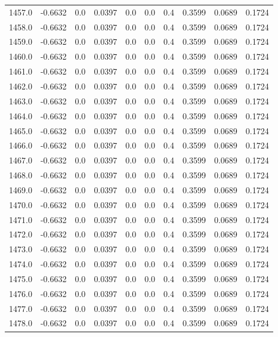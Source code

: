 \begin{longtable}{lrrrrrrrrr}
1457.0 & -0.6632 & 0.0 & 0.0397 & 0.0 & 0.0 & 0.4 & 0.3599 & 0.0689 & 0.1724 \\
1458.0 & -0.6632 & 0.0 & 0.0397 & 0.0 & 0.0 & 0.4 & 0.3599 & 0.0689 & 0.1724 \\
1459.0 & -0.6632 & 0.0 & 0.0397 & 0.0 & 0.0 & 0.4 & 0.3599 & 0.0689 & 0.1724 \\
1460.0 & -0.6632 & 0.0 & 0.0397 & 0.0 & 0.0 & 0.4 & 0.3599 & 0.0689 & 0.1724 \\
1461.0 & -0.6632 & 0.0 & 0.0397 & 0.0 & 0.0 & 0.4 & 0.3599 & 0.0689 & 0.1724 \\
1462.0 & -0.6632 & 0.0 & 0.0397 & 0.0 & 0.0 & 0.4 & 0.3599 & 0.0689 & 0.1724 \\
1463.0 & -0.6632 & 0.0 & 0.0397 & 0.0 & 0.0 & 0.4 & 0.3599 & 0.0689 & 0.1724 \\
1464.0 & -0.6632 & 0.0 & 0.0397 & 0.0 & 0.0 & 0.4 & 0.3599 & 0.0689 & 0.1724 \\
1465.0 & -0.6632 & 0.0 & 0.0397 & 0.0 & 0.0 & 0.4 & 0.3599 & 0.0689 & 0.1724 \\
1466.0 & -0.6632 & 0.0 & 0.0397 & 0.0 & 0.0 & 0.4 & 0.3599 & 0.0689 & 0.1724 \\
1467.0 & -0.6632 & 0.0 & 0.0397 & 0.0 & 0.0 & 0.4 & 0.3599 & 0.0689 & 0.1724 \\
1468.0 & -0.6632 & 0.0 & 0.0397 & 0.0 & 0.0 & 0.4 & 0.3599 & 0.0689 & 0.1724 \\
1469.0 & -0.6632 & 0.0 & 0.0397 & 0.0 & 0.0 & 0.4 & 0.3599 & 0.0689 & 0.1724 \\
1470.0 & -0.6632 & 0.0 & 0.0397 & 0.0 & 0.0 & 0.4 & 0.3599 & 0.0689 & 0.1724 \\
1471.0 & -0.6632 & 0.0 & 0.0397 & 0.0 & 0.0 & 0.4 & 0.3599 & 0.0689 & 0.1724 \\
1472.0 & -0.6632 & 0.0 & 0.0397 & 0.0 & 0.0 & 0.4 & 0.3599 & 0.0689 & 0.1724 \\
1473.0 & -0.6632 & 0.0 & 0.0397 & 0.0 & 0.0 & 0.4 & 0.3599 & 0.0689 & 0.1724 \\
1474.0 & -0.6632 & 0.0 & 0.0397 & 0.0 & 0.0 & 0.4 & 0.3599 & 0.0689 & 0.1724 \\
1475.0 & -0.6632 & 0.0 & 0.0397 & 0.0 & 0.0 & 0.4 & 0.3599 & 0.0689 & 0.1724 \\
1476.0 & -0.6632 & 0.0 & 0.0397 & 0.0 & 0.0 & 0.4 & 0.3599 & 0.0689 & 0.1724 \\
1477.0 & -0.6632 & 0.0 & 0.0397 & 0.0 & 0.0 & 0.4 & 0.3599 & 0.0689 & 0.1724 \\
1478.0 & -0.6632 & 0.0 & 0.0397 & 0.0 & 0.0 & 0.4 & 0.3599 & 0.0689 & 0.1724 \\

\end{longtable}
